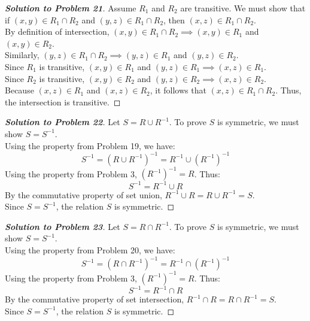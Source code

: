 \documentclass[11pt, a4paper]{article}
\theoremstyle{definition}
\theoremstyle{remark}
\begin{document}
\begin{proof}[\textbf{Solution to Problem 21}]
Assume $R_1$ and $R_2$ are transitive. We must show that if $(x, y) \in R_1 \cap R_2$ and $(y, z) \in R_1 \cap R_2$, then $(x, z) \in R_1 \cap R_2$. \\
By definition of intersection, $(x, y) \in R_1 \cap R_2 \implies (x, y) \in R_1$ and $(x, y) \in R_2$. \\
Similarly, $(y, z) \in R_1 \cap R_2 \implies (y, z) \in R_1$ and $(y, z) \in R_2$. \\
Since $R_1$ is transitive, $(x, y) \in R_1$ and $(y, z) \in R_1 \implies (x, z) \in R_1$. \\
Since $R_2$ is transitive, $(x, y) \in R_2$ and $(y, z) \in R_2 \implies (x, z) \in R_2$. \\
Because $(x, z) \in R_1$ and $(x, z) \in R_2$, it follows that $(x, z) \in R_1 \cap R_2$. Thus, the intersection is transitive.
\end{proof}

\begin{proof}[\textbf{Solution to Problem 22}]
Let $S = R \cup R^{-1}$. To prove $S$ is symmetric, we must show $S = S^{-1}$. \\
Using the property from Problem 19, we have:
\[ S^{-1} = (R \cup R^{-1})^{-1} = R^{-1} \cup (R^{-1})^{-1} \]
Using the property from Problem 3, $(R^{-1})^{-1} = R$. Thus:
\[ S^{-1} = R^{-1} \cup R \]
By the commutative property of set union, $R^{-1} \cup R = R \cup R^{-1} = S$. \\
Since $S = S^{-1}$, the relation $S$ is symmetric.
\end{proof}

\begin{proof}[\textbf{Solution to Problem 23}]
Let $S = R \cap R^{-1}$. To prove $S$ is symmetric, we must show $S = S^{-1}$. \\
Using the property from Problem 20, we have:
\[ S^{-1} = (R \cap R^{-1})^{-1} = R^{-1} \cap (R^{-1})^{-1} \]
Using the property from Problem 3, $(R^{-1})^{-1} = R$. Thus:
\[ S^{-1} = R^{-1} \cap R \]
By the commutative property of set intersection, $R^{-1} \cap R = R \cap R^{-1} = S$. \\
Since $S = S^{-1}$, the relation $S$ is symmetric.
\end{proof}
\end{document}
